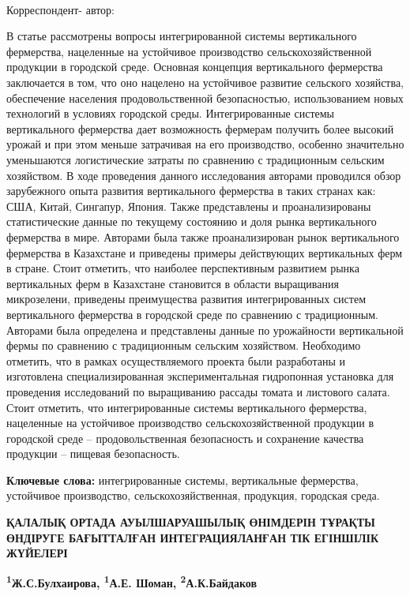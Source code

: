 {\bfseries \textsuperscript{\envelope }} Корреспондент- автор:
\href{mailto:honeyzhu@mail.ru}{}

В статье рассмотрены вопросы интегрированной системы вертикального
фермерства, нацеленные на устойчивое производство сельскохозяйственной
продукции в городской среде. Основная концепция вертикального фермерства
заключается в том, что оно нацелено на устойчивое развитие сельского
хозяйства, обеспечение населения продовольственной безопасностью,
использованием новых технологий в условиях городской среды.
Интегрированные системы вертикального фермерства дает возможность
фермерам получить более высокий урожай и при этом меньше затрачивая на
его производство, особенно значительно уменьшаются логистические затраты
по сравнению с традиционным сельским хозяйством. В ходе проведения
данного исследования авторами проводился обзор зарубежного опыта
развития вертикального фермерства в таких странах как: США, Китай,
Сингапур, Япония. Также представлены и проанализированы статистические
данные по текущему состоянию и доля рынка вертикального фермерства в
мире. Авторами была также проанализирован рынок вертикального фермерства
в Казахстане и приведены примеры действующих вертикальных ферм в стране.
Стоит отметить, что наиболее перспективным развитием рынка вертикальных
ферм в Казахстане становится в области выращивания микрозелени,
приведены преимущества развития интегрированных систем вертикального
фермерства в городской среде по сравнению с традиционным. Авторами была
определена и представлены данные по урожайности вертикальной фермы по
сравнению с традиционным сельским хозяйством. Необходимо отметить, что в
рамках осуществляемого проекта были разработаны и изготовлена
специализированная экспериментальная гидропонная установка для
проведения исследований по выращиванию рассады томата и листового
салата. Стоит отметить, что интегрированные системы вертикального
фермерства, нацеленные на устойчивое производство сельскохозяйственной
продукции в городской среде -- продовольственная безопасность и
сохранение качества продукции -- пищевая безопасность.

{\bfseries Ключевые слова:} интегрированные системы, вертикальные
фермерства, устойчивое производство, сельскохозяйственная, продукция,
городская среда.

{\bfseries ҚАЛАЛЫҚ ОРТАДА АУЫЛШАРУАШЫЛЫҚ ӨНІМДЕРІН ТҰРАҚТЫ ӨНДІРУГЕ
БАҒЫТТАЛҒАН ИНТЕГРАЦИЯЛАНҒАН ТІК ЕГІНШІЛІК ЖҮЙЕЛЕРІ}

{\bfseries \textsuperscript{1}Ж.С.Булхаирова\textsuperscript{\envelope },
\textsuperscript{1}А.Е. Шоман, \textsuperscript{2}А.К.Байдаков}

